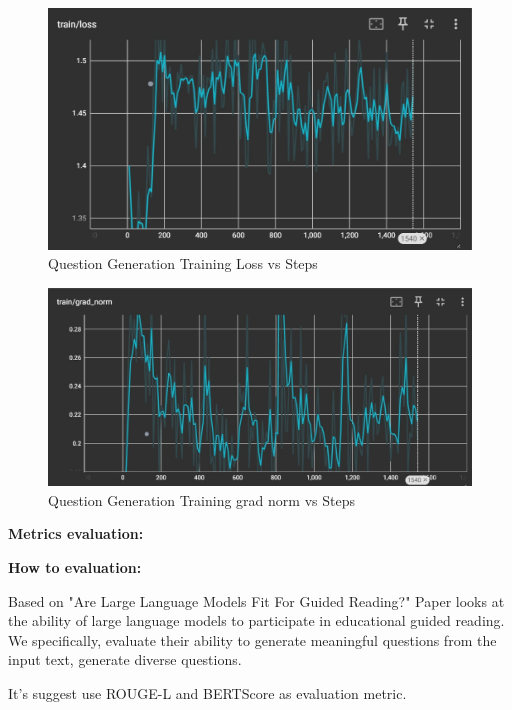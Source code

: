 \begin{figure}[h!]
	\centering
	\includegraphics[scale=0.4]{figures/qg_train_loss.jpeg}
	\caption{ Question Generation Training Loss vs Steps }
\end{figure}

\begin{figure}[h!]
	\centering
	\includegraphics[scale=0.4]{figures/grad_norm.jpeg}
	\caption{ Question Generation Training grad norm vs Steps }
\end{figure}
\newpage

\hfill \break
\textbf{Metrics evaluation:} 

\hfill \break
\textbf{How to evaluation:}

\hfill \break
Based on "Are Large Language Models Fit For Guided Reading?" Paper \cite{ochieng2023large} looks at the ability of large language models to participate in educational
guided reading. We specifically, evaluate their ability to generate meaningful
questions from the input text, generate diverse questions.

It's suggest use ROUGE-L and BERTScore as evaluation metric.

